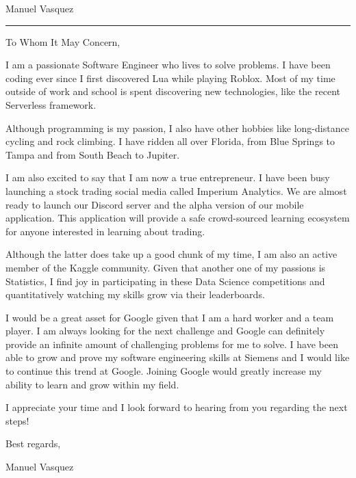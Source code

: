 \documentclass{article}
\newcommand{\position}{I am writing to apply for the \_ position.}
\newcommand{\company}{Google}
\newcommand{\name}{Manuel Vasquez}
\begin{document}
\begin{minipage}[t]{.69\linewidth}
    \begin{center}
        \Huge \name
    \end{center}
    \vspace*{1.89cm}
    \hrule
    \vspace*{.49cm}

    To Whom It May Concern,
    \vspace*{.49cm}

    \raggedright


    I am a passionate Software Engineer who lives to solve problems. I have been coding ever since I first discovered Lua while playing Roblox. Most of my time outside of work and school is spent discovering new technologies, like the recent Serverless framework.
    \vspace*{.49cm}

    Although programming is my passion, I also have other hobbies like long-distance cycling and rock climbing. I have ridden all over Florida, from Blue Springs to Tampa and from South Beach to Jupiter.
    \vspace*{.49cm}

    I am also excited to say that I am now a true entrepreneur. I have been busy launching a stock trading social media called Imperium Analytics. We are almost ready to launch our Discord server and the alpha version of our mobile application. This application will provide a safe crowd-sourced learning ecosystem for anyone interested in learning about trading.
    \vspace*{.49cm}

    Although the latter does take up a good chunk of my time, I am also an active member of the Kaggle community. Given that another one of my passions is Statistics, I find joy in participating in these Data Science competitions and quantitatively watching my skills grow via their leaderboards.
    \vspace*{.49cm}

    I would be a great asset for \company $ $ given that I am a hard worker and a team player. I am always looking for the next challenge and \company $ $ can definitely provide an infinite amount of challenging problems for me to solve. I have been able to grow and prove my software engineering skills at Siemens and I would like to continue this trend at \company. Joining \company $ $ would greatly increase my ability to learn and grow within my field. 
    \vspace*{.49cm}

    I appreciate your time and I look forward to hearing from you regarding the next steps!
    \vspace*{.49cm}

    Best regards,
    \vspace*{.49cm}

    \name
\end{minipage}
\end{document}
